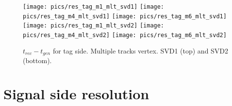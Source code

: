 \documentclass[preprint,aps,showpacs]{revtex4}
\begin{document}
\begin{figure}[htb]
\texttt{[image: pics/res\_tag\_m1\_mlt\_svd1]}
\texttt{[image: pics/res\_tag\_m4\_mlt\_svd1]}
\texttt{[image: pics/res\_tag\_m6\_mlt\_svd1]}\\
\texttt{[image: pics/res\_tag\_m1\_mlt\_svd2]}
\texttt{[image: pics/res\_tag\_m4\_mlt\_svd2]}
\texttt{[image: pics/res\_tag\_m6\_mlt\_svd2]}\\
\caption{$t_{rec}-t_{gen}$ for tag side. Multiple tracks vertex. SVD1 (top) and SVD2 (bottom).}
\label{fig:R_det_asc_mlt}
\end{figure}

\section{Signal side resolution}
\end{document}
